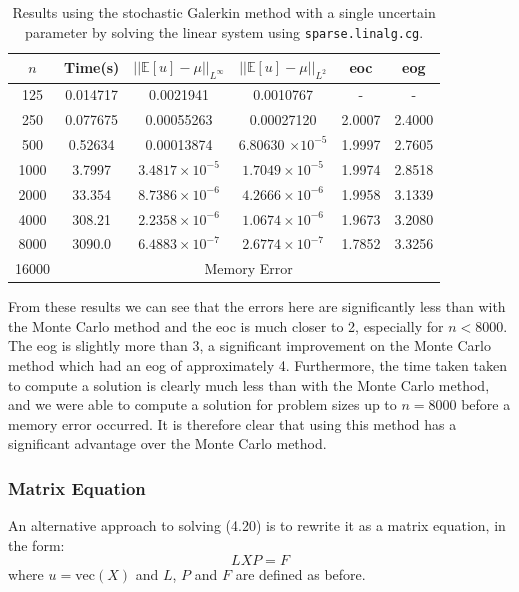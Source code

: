 \documentclass[11pt]{article}
\numberwithin{equation}{section}
\begin{document}
\begin{table}[H]
\centering
\begin{tabular}{|c|c|c|c|c|c|}
\hline
$n$ & Time(s) & $|| \mathbb{E}[u] - \mu ||_{L^{\infty}}$ & $|| \mathbb{E}[u] - \mu ||_{L^{2}}$ & eoc & eog \\
\hline
125 & 0.014717 & 0.0021941 & 0.0010767 & - & - \\
250 & 0.077675 & 0.00055263 & 0.00027120 & 2.0007 & 2.4000 \\
500 & 0.52634 & 0.00013874 & 6.80630 $\times 10^{-5}$ & 1.9997 & 2.7605 \\
1000 & 3.7997 & $3.4817 \times 10^{-5}$ & $1.7049 \times 10^{-5}$ & 1.9974 & 2.8518  \\
2000 & 33.354 & $8.7386 \times 10^{-6}$ & $4.2666 \times 10^{-6}$ & 1.9958 & 3.1339 \\
4000 & 308.21 & $2.2358 \times 10^{-6}$ & $1.0674 \times 10^{-6}$ & 1.9673 & 3.2080 \\
8000 & 3090.0 & $6.4883 \times 10^{-7}$ & $2.6774 \times 10^{-7}$ & 1.7852 & 3.3256 \\
\cline{2-6}
16000 & \multicolumn{5}{c|}{Memory Error} \\
\hline
\end{tabular}
\captionsetup{justification=centering}
\caption{Results using the stochastic Galerkin method with a single uncertain parameter by solving the linear system using \texttt{sparse.linalg.cg}.}
\label{table:stochastic linear}
\end{table}

From these results we can see that the errors here are significantly less than with the Monte Carlo method and the eoc is much closer to 2, especially for $n<8000$. The eog is slightly more than 3, a significant improvement on the Monte Carlo method which had an eog of approximately 4. Furthermore, the time taken taken to compute a solution is clearly much less than with the Monte Carlo method, and we were able to compute a solution for problem sizes up to $n=8000$ before a memory error occurred. It is therefore clear that using this method has a significant advantage over the Monte Carlo method.

\subsubsection*{Matrix Equation}
An alternative approach to solving (4.20) is to rewrite it as a matrix equation, in the form:
\begin{equation}
LXP = F
\end{equation} 
where $u = \text{vec}(X)$ and $L$, $P$ and $F$ are defined as before. 
\end{document}
